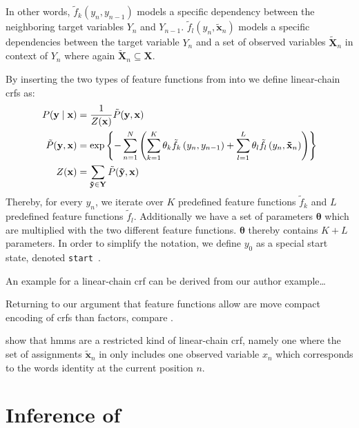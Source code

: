 In other words, $\tilde{f}_k(y_n,y_{n-1})$ models a specific dependency between the neighboring \glspl{target variable} $Y_n$ and $Y_{n-1}$. $\tilde{f}_l(y_n,\mathbf{\tilde{x}}_n)$ models a specific dependencies between the \gls{target variable} $Y_n$ and a set of \glspl{observed variable} $\mathbf{\tilde{X}}_n$ in context of $Y_n$ where again $\mathbf{\tilde{X}}_n\subseteq\mathbf{X}$.

By inserting the two types of \glspl{feature function} from  into  we define \glspl{linear-chain crf} as:
\begin{equation}
  \label{equ:linear-chain-crf-log-linear}
  \begin{split}
    P(\mathbf{y}\mid\mathbf{x}) & = \frac{1}{Z(\mathbf{x})}\tilde{P}(\mathbf{y},\mathbf{x})  \\
    \tilde{P}(\mathbf{y},\mathbf{x}) & = \exp\left\{ -\sum_{n=1}^N \left(\sum_{k=1}^K\theta_k \tilde{f}_k\left(\vphantom{\tilde{x}}y_n,y_{n-1}\right)+\sum_{l=1}^L\theta_l \tilde{f}_l\left(y_n,\mathbf{\tilde{x}}_n\right)\right) \right\} \\
    Z(\mathbf{x}) & = \sum_{\mathbf{\tilde{y}}\in\mathbf{Y}}\tilde{P}(\mathbf{\tilde{y}},\mathbf{x})
  \end{split}
\end{equation}
Thereby, for every $y_n$, we iterate over $K$ predefined \glspl{feature function} $\tilde{f}_k$ and $L$ predefined \glspl{feature function} $\tilde{f}_l$.
Additionally we have a set of parameters $\mathbf{\theta}$ which are multiplied with the two different feature functions.
$\mathbf{\theta}$ thereby contains $K+L$ parameters.
In order to simplify the notation, we define $y_0$ as a special start state, denoted \texttt{start}~\citep{lafferty2001conditional}.

An example for a  \gls{linear-chain crf} can be derived from our author example\dots{}

Returning to our argument that \glspl{feature function} allow are move compact encoding of \glspl{crf} than \glspl{factor}, compare .

\citet{sutton2010introduction} show that \glspl{hmm} are a restricted kind of \gls{linear-chain crf}, namely one where the set of assignments $\mathbf{\tilde{x}}_n$ in  only includes one \gls{observed variable} $x_n$ which corresponds to the words identity at the current position $n$.

\section{Inference of }\label{sec:inference-crfs}


